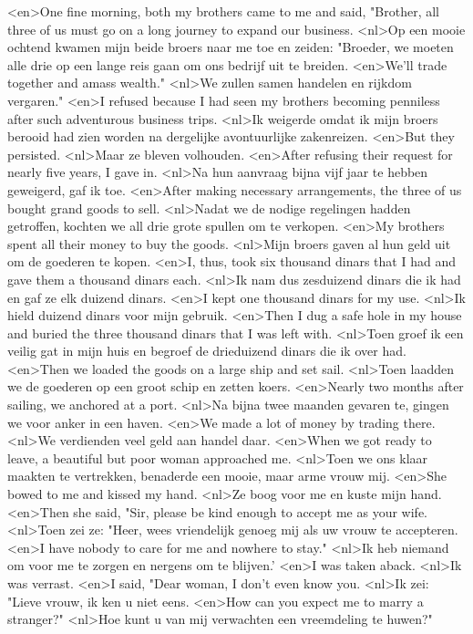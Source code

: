 <en>One fine morning, both my brothers came to me and said, "Brother, all three of us must go on a long journey to expand our business.
<nl>Op een mooie ochtend kwamen mijn beide broers naar me toe en zeiden: "Broeder, we moeten alle drie op een lange reis gaan om ons bedrijf uit te breiden.
<en>We'll trade together and amass wealth."
<nl>We zullen samen handelen en rijkdom vergaren."
<en>I refused because I had seen my brothers becoming penniless after such adventurous business trips.
<nl>Ik weigerde omdat ik mijn broers berooid had zien worden na dergelijke avontuurlijke zakenreizen.
<en>But they persisted.
<nl>Maar ze bleven volhouden.
<en>After refusing their request for nearly five years, I gave in.
<nl>Na hun aanvraag  bijna vijf jaar te hebben geweigerd, gaf ik toe.
<en>After making necessary arrangements, the three of us bought grand goods to sell.
<nl>Nadat we de nodige regelingen hadden getroffen, kochten we all drie grote spullen om te verkopen.
<en>My brothers spent all their money to buy the goods.
<nl>Mijn broers gaven al hun geld uit om de goederen te kopen.
<en>I, thus, took six thousand dinars that I had and gave them a thousand dinars each.
<nl>Ik nam dus zesduizend dinars die ik had en gaf ze elk duizend dinars.
<en>I kept one thousand dinars for my use.
<nl>Ik hield duizend dinars voor mijn gebruik.
<en>Then I dug a safe hole in my house and buried the three thousand dinars that I was left with.
<nl>Toen groef ik een veilig gat in mijn huis en begroef de drieduizend dinars die ik over had.
<en>Then we loaded the goods on a large ship and set sail.
<nl>Toen laadden we de goederen op een groot schip en zetten koers.
<en>Nearly two months after sailing, we anchored at a port.
<nl>Na bijna twee maanden gevaren te, gingen we voor anker in een haven.
<en>We made a lot of money by trading there.
<nl>We verdienden veel geld aan handel daar.
<en>When we got ready to leave, a beautiful but poor woman approached me.
<nl>Toen we ons klaar maakten te vertrekken, benaderde een mooie, maar arme vrouw mij.
<en>She bowed to me and kissed my hand.
<nl>Ze boog voor me en kuste mijn hand.
<en>Then she said, "Sir, please be kind enough to accept me as your wife.
<nl>Toen zei ze: "Heer, wees vriendelijk genoeg mij als uw vrouw te accepteren.
<en>I have nobody to care for me and nowhere to stay."
<nl>Ik heb niemand om voor me te zorgen en nergens om te blijven.'
<en>I was taken aback.
<nl>Ik was verrast.
<en>I said, "Dear woman, I don't even know you.
<nl>Ik zei: "Lieve vrouw, ik ken u niet eens.
<en>How can you expect me to marry a stranger?"
<nl>Hoe kunt u  van mij verwachten  een vreemdeling te huwen?"
